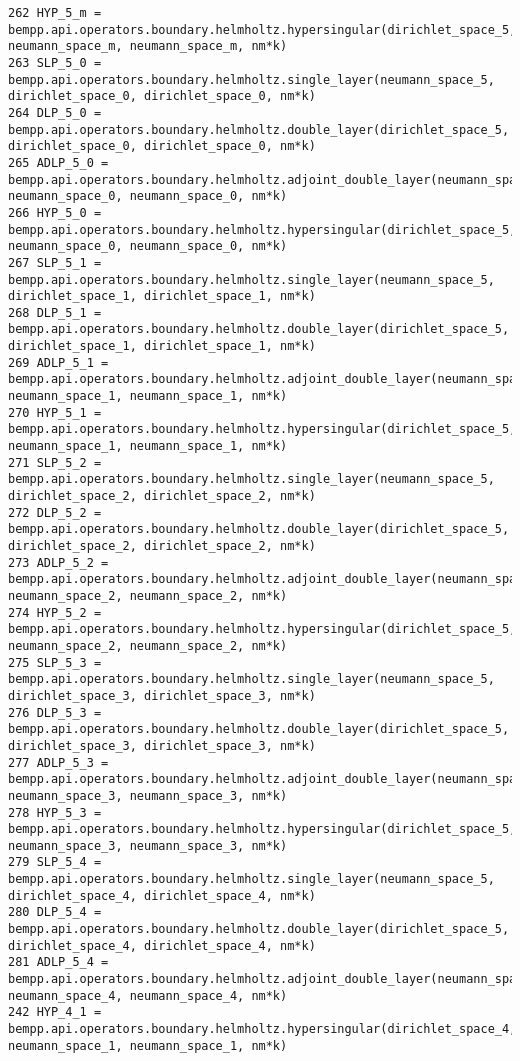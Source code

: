 \documentclass[12pt,letterpaper]{report}
\numberwithin{equation}{section}
\begin{document}
\begin{lstlisting}
262 HYP_5_m = bempp.api.operators.boundary.helmholtz.hypersingular(dirichlet_space_5, neumann_space_m, neumann_space_m, nm*k)
263 SLP_5_0 = bempp.api.operators.boundary.helmholtz.single_layer(neumann_space_5, dirichlet_space_0, dirichlet_space_0, nm*k)
264 DLP_5_0 = bempp.api.operators.boundary.helmholtz.double_layer(dirichlet_space_5, dirichlet_space_0, dirichlet_space_0, nm*k)
265 ADLP_5_0 = bempp.api.operators.boundary.helmholtz.adjoint_double_layer(neumann_space_5, neumann_space_0, neumann_space_0, nm*k)
266 HYP_5_0 = bempp.api.operators.boundary.helmholtz.hypersingular(dirichlet_space_5, neumann_space_0, neumann_space_0, nm*k)
267 SLP_5_1 = bempp.api.operators.boundary.helmholtz.single_layer(neumann_space_5, dirichlet_space_1, dirichlet_space_1, nm*k)
268 DLP_5_1 = bempp.api.operators.boundary.helmholtz.double_layer(dirichlet_space_5, dirichlet_space_1, dirichlet_space_1, nm*k)
269 ADLP_5_1 = bempp.api.operators.boundary.helmholtz.adjoint_double_layer(neumann_space_5, neumann_space_1, neumann_space_1, nm*k)
270 HYP_5_1 = bempp.api.operators.boundary.helmholtz.hypersingular(dirichlet_space_5, neumann_space_1, neumann_space_1, nm*k)
271 SLP_5_2 = bempp.api.operators.boundary.helmholtz.single_layer(neumann_space_5, dirichlet_space_2, dirichlet_space_2, nm*k)
272 DLP_5_2 = bempp.api.operators.boundary.helmholtz.double_layer(dirichlet_space_5, dirichlet_space_2, dirichlet_space_2, nm*k)
273 ADLP_5_2 = bempp.api.operators.boundary.helmholtz.adjoint_double_layer(neumann_space_5, neumann_space_2, neumann_space_2, nm*k)
274 HYP_5_2 = bempp.api.operators.boundary.helmholtz.hypersingular(dirichlet_space_5, neumann_space_2, neumann_space_2, nm*k)
275 SLP_5_3 = bempp.api.operators.boundary.helmholtz.single_layer(neumann_space_5, dirichlet_space_3, dirichlet_space_3, nm*k)
276 DLP_5_3 = bempp.api.operators.boundary.helmholtz.double_layer(dirichlet_space_5, dirichlet_space_3, dirichlet_space_3, nm*k)
277 ADLP_5_3 = bempp.api.operators.boundary.helmholtz.adjoint_double_layer(neumann_space_5, neumann_space_3, neumann_space_3, nm*k)
278 HYP_5_3 = bempp.api.operators.boundary.helmholtz.hypersingular(dirichlet_space_5, neumann_space_3, neumann_space_3, nm*k)
279 SLP_5_4 = bempp.api.operators.boundary.helmholtz.single_layer(neumann_space_5, dirichlet_space_4, dirichlet_space_4, nm*k)
280 DLP_5_4 = bempp.api.operators.boundary.helmholtz.double_layer(dirichlet_space_5, dirichlet_space_4, dirichlet_space_4, nm*k)
281 ADLP_5_4 = bempp.api.operators.boundary.helmholtz.adjoint_double_layer(neumann_space_5, neumann_space_4, neumann_space_4, nm*k)
242 HYP_4_1 = bempp.api.operators.boundary.helmholtz.hypersingular(dirichlet_space_4, neumann_space_1, neumann_space_1, nm*k)

\end{lstlisting}
\end{document}
